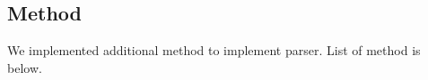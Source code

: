 \documentclass[12pt]{article}
\begin{document}









\subsection{Method}
We implemented additional method to implement parser.
List of method is below.
\end{document}
